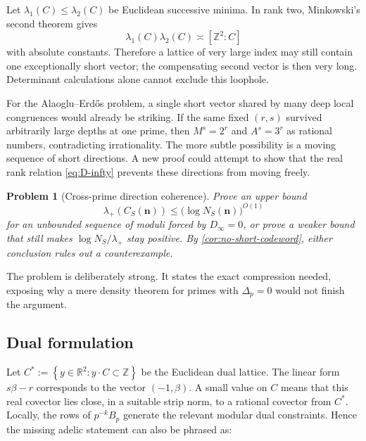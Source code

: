\documentclass[11pt,oneside]{article}
\newtheorem{problem}[theorem]{Problem}
\theoremstyle{definition}
\newcommand{\Z}{\mathbb{Z}}
\newcommand{\R}{\mathbb{R}}
\newcommand{\set}[1]{\left\{#1\right\}}
\begin{document}
Let $\lambda_1(C)\le\lambda_2(C)$ be Euclidean successive minima.  In
rank two, Minkowski's second theorem gives
\begin{equation}\label{eq:second-minkowski}
  \lambda_1(C)\lambda_2(C)\asymp [\Z^2:C]
\end{equation}
with absolute constants.  Therefore a lattice of very large index may
still contain one exceptionally short vector; the compensating second
vector is then very long.  Determinant calculations alone cannot exclude
this loophole.

For the Alaoglu--Erd\H{o}s problem, a single short vector shared by many
deep local congruences would already be striking.  If the same fixed
$(r,s)$ survived arbitrarily large depths at one prime, then
$M^s=2^r$ and $A^s=3^r$ as rational numbers, contradicting irrationality.
The more subtle possibility is a moving sequence of short directions.  A
new proof could attempt to show that the real rank relation
\eqref{eq:D-infty} prevents these directions from moving freely.

\begin{problem}[Cross-prime direction coherence]\label{prob:direction-coherence}
Prove an upper bound
\begin{equation}\label{eq:desired-compression}
  \lambda_+(C_S(\bm n))
  \le \bigl(\log N_S(\bm n)\bigr)^{O(1)}
\end{equation}
for an unbounded sequence of moduli forced by $D_\infty=0$, or prove a
weaker bound that still makes
$\log N_S/\lambda_+$ stay positive.  By
\cref{cor:no-short-codeword}, either conclusion rules out a
counterexample.
\end{problem}

The problem is deliberately strong.  It states the exact compression
needed, exposing why a mere density theorem for primes with
$\Delta_p=0$ would not finish the argument.

\subsection{Dual formulation}

Let $C^*:=\set{y\in\R^2:y\cdot C\subset\Z}$ be the Euclidean dual
lattice.  The linear form $s\beta-r$ corresponds to the vector
$(-1,\beta)$.  A small value on $C$ means that this real covector lies
close, in a suitable strip norm, to a rational covector from $C^*$.
Locally, the rows of $p^{-k}B_p$ generate the relevant modular dual
constraints.  Hence the missing adelic statement can also be phrased as:
\end{document}
